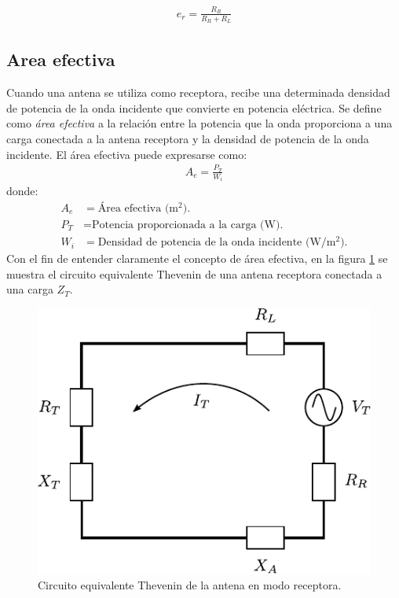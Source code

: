 \begin{align}
e_r = \frac{R_R}{R_R + R_L}
\label{ec_intro:45}
\end{align}

\subsection{Area efectiva}
\label{subsec_intro_area_efec}

Cuando una antena se utiliza como receptora, recibe una determinada densidad de potencia de la onda incidente que convierte en potencia eléctrica. Se define como \emph{área efectiva} a la relación entre la potencia que la onda proporciona a una carga conectada a la antena receptora y la densidad de potencia de la onda incidente. El área efectiva puede expresarse como:
\begin{align}
A_e = \frac{P_T}{W_i}
\label{ec_intro:46}
\end{align}
donde:
\begin{align*}
A_e &= \text{Área efectiva (m$^2$).}\\
P_T &= \text{Potencia proporcionada a la carga (W).}\\
W_i &= \text{Densidad de potencia de la onda incidente (W/m$^2$).}
\end{align*}
Con el fin de entender claramente el concepto de área efectiva, en la figura \ref{fig_intro:6} se muestra el circuito equivalente Thevenin de una antena receptora conectada a una carga $Z_T$.
\begin{figure} [H]
\centering 
\includegraphics[scale = 1]{Figures/Intro/intro_6.pdf}
\caption{Circuito equivalente Thevenin de la antena en modo receptora.}
\label{fig_intro:6}
\end{figure}
